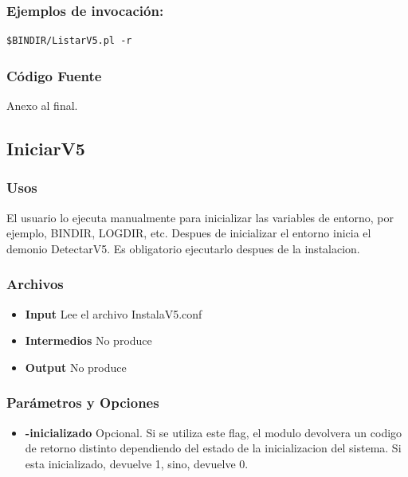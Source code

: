 \documentclass[a4paper,10pt,titlepage]{article}
\begin{document}
		\subsubsection{Ejemplos de invocación:}

\begin{verbatim}
$BINDIR/ListarV5.pl -r 
\end{verbatim}


		\subsubsection{C\'odigo Fuente}
			Anexo al final.

	\subsection{IniciarV5}
		\subsubsection{Usos}

El usuario lo ejecuta manualmente para inicializar las variables de entorno, por ejemplo, BINDIR, LOGDIR, etc. Despues de inicializar el entorno inicia el demonio DetectarV5. Es obligatorio ejecutarlo despues de la instalacion.

		\subsubsection{Archivos}
			\begin {itemize}
				\item \textbf{Input} {Lee el archivo InstalaV5.conf}
				\item \textbf{Intermedios} {No produce}
				\item \textbf{Output} {No produce}
			\end{itemize}

		\subsubsection{Par\'ametros y Opciones}
			\begin {itemize}
				\item \textbf{-inicializado} {Opcional. Si se utiliza este flag, el modulo devolvera un codigo de retorno distinto dependiendo del estado de la inicializacion del sistema. Si esta inicializado, devuelve 1, sino, devuelve 0.}
			\end{itemize}
	
\end{document}
